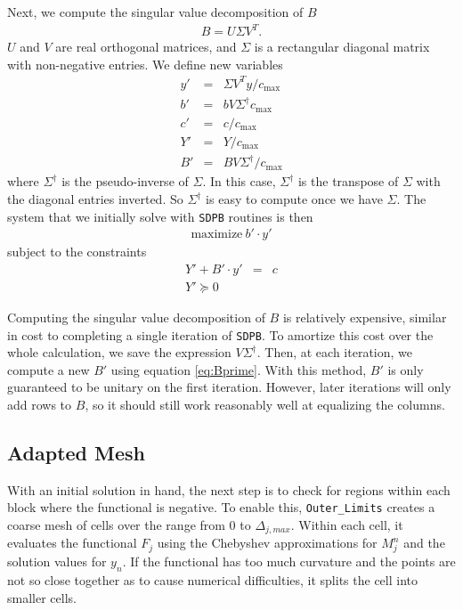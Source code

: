 \documentclass[12pt]{article}
\numberwithin{equation}{section}
\begin{document}
Next, we compute the singular value decomposition of $B$
\begin{eqnarray}
  B = U \Sigma V^T.
\end{eqnarray}
$U$ and $V$ are real orthogonal matrices, and $\Sigma$ is a rectangular
diagonal matrix with non-negative entries.  We define new
variables
\begin{eqnarray}
  y' & = & \Sigma V^T y/c_{\max}\\
  b' & = & b V \Sigma^{\dagger}c_{\max}\\
  c' & = & c/c_{\max}\\
  Y' & = & Y/c_{\max}\\
  B' & = & B V \Sigma^{\dagger}/c_{\max}
           \label{eq:Bprime}
\end{eqnarray}
where $\Sigma^{\dagger}$ is the pseudo-inverse of $\Sigma$.  In this
case, $\Sigma^{\dagger}$ is the transpose of $\Sigma$ with the
diagonal entries inverted.  So $\Sigma^{\dagger}$ is easy to compute
once we have $\Sigma$.  The system that we initially solve with
\texttt{SDPB} routines is then
\begin{eqnarray}
  \textrm{maximize}~b'\cdot y'
\end{eqnarray}
subject to the constraints
\begin{eqnarray}
  Y' + B'\cdot y' & = & c\\
  Y' \succeq 0
\end{eqnarray}

Computing the singular value decomposition of $B$ is relatively
expensive, similar in cost to completing a single iteration of
\texttt{SDPB}.  To amortize this cost over the whole calculation, we
save the expression $V \Sigma^{\dagger}$.  Then, at each iteration, we
compute a new $B'$ using equation \ref{eq:Bprime}.  With this method,
$B'$ is only guaranteed to be unitary on the first iteration.
However, later iterations will only add rows to $B$, so it should
still work reasonably well at equalizing the columns.

\subsection{Adapted Mesh}
\label{subsec:adaptedmesh}

With an initial solution in hand, the next step is to check for
regions within each block where the functional is negative.  To enable
this, \texttt{Outer\_Limits} creates a coarse mesh of
cells over the range from $0$ to $\Delta_{j,max}$.  Within each cell,
it evaluates the functional $F_j$ using the Chebyshev approximations
for $M_j^n$ and the solution values for $y_n$.  If the functional has
too much curvature and the points are not so close together as to
cause numerical difficulties, it splits the cell into smaller cells.
\end{document}
